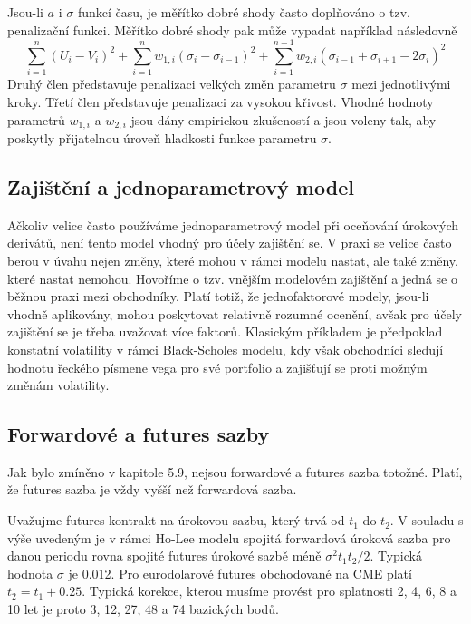 \documentclass[a4paper]{book}
\begin{document}
Jsou-li $a$ i $\sigma$ funkcí času, je měřítko dobré shody často doplňováno o tzv. penalizační funkci. Měřítko dobré shody pak může vypadat například následovně
\begin{equation*}
\sum^{n}_{i=1}(U_i - V_i)^2 + \sum^n_{i=1}w_{1,i}(\sigma_i - \sigma_{i-1})^2 + \sum^{n-1}_{i=1}w_{2,i}(\sigma_{i-1}+\sigma_{i+1}-2 \sigma_i)^2
\end{equation*}
Druhý člen představuje penalizaci velkých změn parametru $\sigma$ mezi jednotlivými kroky. Třetí člen představuje penalizaci za vysokou křivost. Vhodné hodnoty parametrů $w_{1,i}$ a $w_{2,i}$ jsou dány empirickou zkušeností a jsou voleny tak, aby poskytly přijatelnou úroveň hladkosti funkce parametru $\sigma$.

\subsection{Zajištění a jednoparametrový model}

Ačkoliv velice často používáme jednoparametrový model při oceňování úrokových derivátů, není tento model vhodný pro účely zajištění se. V praxi se velice často berou v úvahu nejen změny, které mohou v rámci modelu nastat, ale také změny, které nastat nemohou. Hovoříme o tzv. vnějším modelovém zajištění a jedná se o běžnou praxi mezi obchodníky. Platí totiž, že jednofaktorové modely, jsou-li vhodně aplikovány, mohou poskytovat relativně rozumné ocenění, avšak pro účely zajištění se je třeba uvažovat více faktorů. Klasickým příkladem je předpoklad konstatní volatility v rámci Black-Scholes modelu, kdy však obchodníci sledují hodnotu řeckého písmene vega pro své portfolio a zajišťují se proti možným změnám volatility.

\subsection{Forwardové a futures sazby}

Jak bylo zmíněno v kapitole 5.9, nejsou forwardové a futures sazba totožné. Platí, že futures sazba je vždy vyšší než forwardová sazba.

Uvažujme futures kontrakt na úrokovou sazbu, který trvá od $t_1$ do $t_2$. V souladu s výše uvedeným je v rámci Ho-Lee modelu  spojitá forwardová úroková sazba pro danou periodu rovna spojité futures úrokové sazbě méně $\sigma^2 t_1 t_2 / 2$. Typická hodnota $\sigma$ je 0.012. Pro eurodolarové futures obchodované na CME platí $t_2 = t_1 + 0.25$. Typická korekce, kterou musíme provést pro splatnosti 2, 4, 6, 8 a 10 let je proto 3, 12, 27, 48 a 74 bazických bodů.
\end{document}
